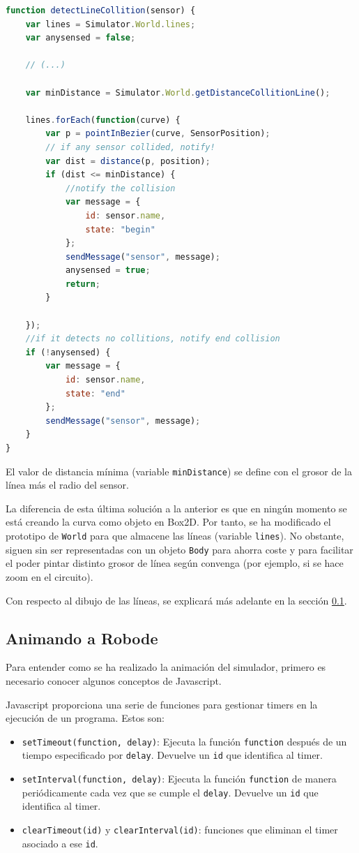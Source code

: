 \begin{lstlisting}[language={Javascript},label={code:deteccion-bezier}, caption={Función que detecta líneas (curvas de Bezier).}]
function detectLineCollition(sensor) {
	var lines = Simulator.World.lines;
	var anysensed = false;

	// (...)

	var minDistance = Simulator.World.getDistanceCollitionLine();

	lines.forEach(function(curve) {
		var p = pointInBezier(curve, SensorPosition);
		// if any sensor collided, notify!
		var dist = distance(p, position);
		if (dist <= minDistance) {
			//notify the collision
			var message = {
				id: sensor.name,
				state: "begin"
			};
			sendMessage("sensor", message);
			anysensed = true;
			return;
		}

	});
	//if it detects no collitions, notify end collision
	if (!anysensed) {
		var message = {
			id: sensor.name,
			state: "end"
		};
		sendMessage("sensor", message);
	}
}
\end{lstlisting}

El valor de distancia mínima (variable \texttt{minDistance}) se define con el grosor de la línea más el radio del sensor.

La diferencia de esta última solución a la anterior es que en ningún momento se está creando la curva como objeto en Box2D. Por tanto, se ha modificado el prototipo de \texttt{World} para que almacene las líneas (variable \texttt{lines}). No obstante, siguen sin ser representadas con un objeto \texttt{Body} para ahorra coste y para facilitar el poder pintar distinto grosor de línea según convenga (por ejemplo, si se hace zoom en el circuito).

Con respecto al dibujo de las líneas, se explicará más adelante en la sección \ref{animando-robode}.


\subsection{Animando a Robode}
\label{animando-robode}


Para entender como se ha realizado la animación del simulador, primero es necesario conocer algunos conceptos de Javascript.

Javascript proporciona una serie de funciones para gestionar timers en la ejecución de un programa. Estos son:

\begin{itemize}
	\item \texttt{setTimeout(function, delay)}: Ejecuta la función \texttt{function} después de un tiempo especificado por \texttt{delay}. Devuelve un \texttt{id} que identifica al timer.
	\item \texttt{setInterval(function, delay)}: Ejecuta la función \texttt{function} de manera periódicamente cada vez que se cumple el \texttt{delay}. Devuelve un \texttt{id} que identifica al timer.
	\item \texttt{clearTimeout(id)} y \texttt{clearInterval(id)}: funciones que eliminan el timer asociado a ese \texttt{id}.
\end{itemize}

